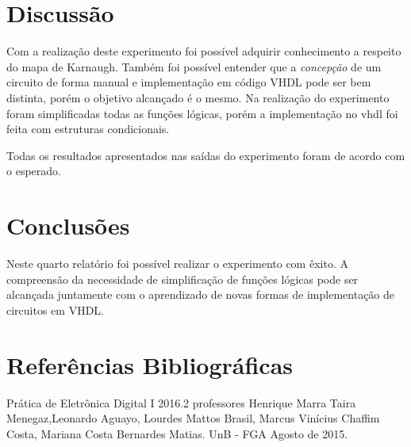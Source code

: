 \documentclass[12pts]{article}
\begin{document}
\section{Discussão}

	Com a realização deste experimento foi possível adquirir conhecimento a respeito do mapa de Karnaugh. Também foi possível entender que a \textit{concepção} de um circuito de forma manual e implementação em código VHDL pode ser bem distinta, porém o objetivo alcançado é o mesmo. Na realização do experimento foram simplificadas todas as funções lógicas, porém a implementação no vhdl foi feita com estruturas condicionais.

	Todas os resultados apresentados nas saídas do experimento foram de acordo com o esperado.

\section{Conclusões}

	Neste quarto relatório foi possível realizar o experimento com êxito. A compreensão da necessidade de simplificação de funções lógicas pode ser alcançada juntamente com o aprendizado de novas formas de implementação de circuitos em VHDL.



\section{Referências Bibliográficas}

Prática de Eletrônica Digital I 2016.2 professores Henrique Marra Taira Menegaz,Leonardo Aguayo, Lourdes Mattos Brasil, Marcus Vinícius Chaffim Costa, Mariana Costa Bernardes Matias. UnB - FGA Agosto de 2015.

\newpage
\end{document}
